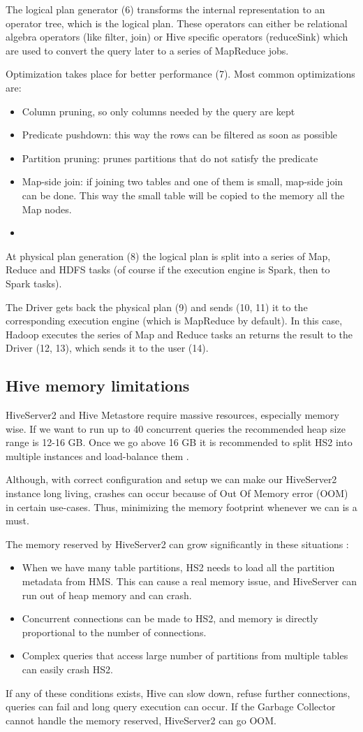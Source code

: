 The logical plan generator (6) transforms the internal representation to an operator tree, which is the logical plan. These operators can either be relational algebra operators (like filter, join) or Hive specific operators (\eg reduceSink) which are used to convert the query later to a series of MapReduce jobs.

Optimization takes place for better performance (7). Most common optimizations are: 
\begin{itemize}
	\item Column pruning, so only columns needed by the query are kept
	\item Predicate pushdown: this way the rows can be filtered as soon as possible
	\item Partition pruning: prunes partitions that do not satisfy the predicate
	\item Map-side join: if joining two tables and one of them is small, map-side join can be done. This way the small table will be copied to the memory all the Map nodes.
	\item \etc
\end{itemize}

At physical plan generation (8) the logical plan is split into a series of Map, Reduce and HDFS tasks (of course if the execution engine is Spark, then to Spark tasks). 

The Driver gets back the physical plan (9) and sends (10, 11) it to the corresponding execution engine (which is MapReduce by default). In this case, Hadoop executes the series of Map and Reduce tasks an returns the result to the Driver (12, 13), which sends it to the user (14).

\subsection{Hive memory limitations}
HiveServer2 and Hive Metastore require massive resources, especially memory wise. If we want to run up to 40 concurrent queries the recommended heap size range is 12-16 GB. Once we go above 16 GB it is recommended to split HS2 into multiple instances and load-balance them \cite{Hive-memory-problems}.

Although, with correct configuration and setup we can make our HiveServer2 instance long living, crashes can occur because of Out Of Memory error (OOM) in certain use-cases. Thus, minimizing the memory footprint whenever we can is a must.

\noindent The memory reserved by HiveServer2 can grow significantly in these situations  \cite{Hive-memory-problems}: 
\begin{itemize}
	\item When we have many table partitions, HS2 needs to load all the partition metadata from HMS. This can cause a real memory issue, and  HiveServer can run out of heap memory and can crash.
	\item Concurrent connections can be made to HS2, and memory is directly proportional to the number of connections. 
	\item Complex queries that access large number of partitions from multiple tables can easily crash HS2.
\end{itemize}

If any of these conditions exists, Hive can slow down, refuse further connections, queries can fail and long query execution can occur. If the Garbage Collector cannot handle the memory reserved, HiveServer2 can go OOM.